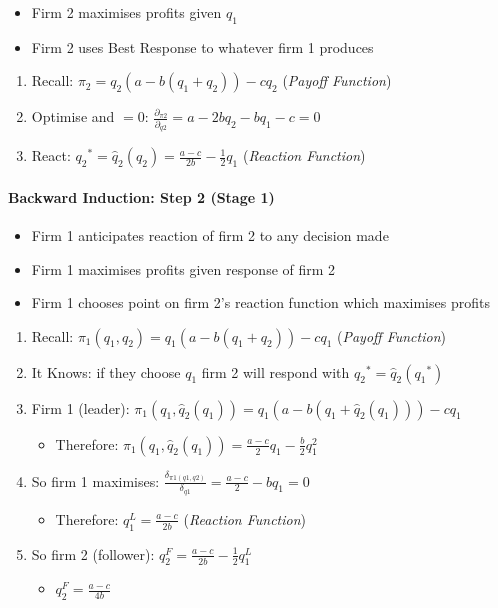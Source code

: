 \documentclass[11pt, english]{article}
\begin{document}
	\begin{itemize}
	\setlength\itemsep{0cm}
		\item Firm 2 maximises profits given $q_1$
		\item Firm 2 uses Best Response to whatever firm 1 produces
	\end{itemize}

	\begin{enumerate}
        \setlength\itemsep{0cm}
		\item Recall: $\pi_2=q_2(a-b(q_1+q_2))-cq_2$ (\textit{Payoff Function})
		\item Optimise and $=0$: $\frac{\partial_{\pi2}}{\partial_{q2}}=a-2{bq}_2-bq_1-c=0$
		\item React: ${q_2}^\ast={\hat{q}}_2\left(q_2\right)=\frac{a-c}{2b}-\frac{1}{2}q_1$ (\textit{Reaction Function})
	\end{enumerate}

	\newpage

		\paragraph{Backward Induction: Step 2 (Stage 1)}

	\begin{itemize}
	\setlength\itemsep{0cm}
		\item Firm 1 anticipates reaction of firm 2 to any decision made
		\item Firm 1 maximises profits given response of firm 2
		\item Firm 1 chooses point on firm 2’s reaction function which maximises profits
	\end{itemize}
	
	\begin{enumerate}                                       
        \setlength\itemsep{0cm}
		\item Recall: $\pi_1(q_1{,q}_2)=q_1(a-b(q_1+q_2))-cq_1$ (\textit{Payoff Function})
		\item It Knows: if they choose $q_1$ firm 2 will respond with ${q_2}^\ast={\hat{q}}_2({q_1}^\ast)$
		\item Firm 1 (leader): $\pi_1(q_1{,\hat{q}}_2(q_1))=q_1(a-b(q_1+{\hat{q}}_2(q_1)))-cq_1$
		\begin{itemize}
			\item Therefore: $\pi_1\left(q_1{,\hat{q}}_2\left(q_1\right)\right)=\frac{a-c}{2}q_1-\frac{b}{2}q_1^2$
		\end{itemize}
		\item So firm 1 maximises: $\frac{\delta_{\pi1(q1,q2)}}{\delta_{q1}}=\frac{a-c}{2}-{bq}_1=0$
		\begin{itemize}
			\item Therefore: $q_1^L=\frac{a-c}{2b}$ (\textit{Reaction Function})
		\end{itemize}
		\item So firm 2 (follower): $q_2^F=\frac{a-c}{2b}-\frac{1}{2}q_1^L$
		\begin{itemize}
			\item $q_2^F=\frac{a-c}{4b}$
		\end{itemize}
	\end{enumerate}
\end{document}
